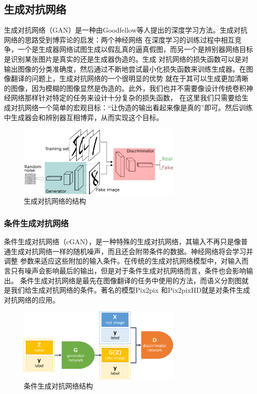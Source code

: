 \documentclass[supercite]{HustGraduPaper}
\theoremstyle{definition}
\begin{document}
\subsection{生成对抗网络}

生成对抗网络（GAN）是一种由Goodfellow等人提出的深度学习方法\cite{Goodfellow-et-al-2016}。生成对抗网络的思路受到博弈论的启发：两个神经网络
在深度学习的训练过程中相互竞争，一个是生成器网络试图生成以假乱真的逼真假图，而另一个是辨别器网络目标是识别某张图片是真实的还是生成器伪造的。生成
对抗网络的损失函数可以是对输出图像的分类准确度，然后通过不断地尝试最小化损失函数来训练生成器。在图像翻译的问题上，生成对抗网络的一个很明显的优势
就在于其可以生成更加清晰的图像，因为模糊的图像显然是伪造的。此外，我们也并不需要像设计传统卷积神经网络那样针对特定的任务来设计十分复杂的损失函数，
在这里我们只需要给生成对抗网络一个简单的宏观目标：“让伪造的输出看起来像是真的”即可。然后训练中生成器会和辨别器互相博弈，从而实现这个目标。
\begin{figure}[H]
  \begin{center}
  \includegraphics[width=8cm]{images/GANs}
  \end{center}
  \caption{生成对抗网络的结构}
  \label{fig:GANs-structure}
\end{figure}

\subsubsection{条件生成对抗网络}

条件生成对抗网络（cGAN），是一种特殊的生成对抗网络，其输入不再只是像普通生成对抗网络一样的随机噪声，而且还会附带条件的数据。神经网络将会学习并调整
参数来适应这些附加的输入条件。在传统的生成对抗网络模型中，对输入而言只有噪声会影响最后的输出，但是对于条件生成对抗网络而言，条件也会影响输出。
条件生成对抗网络是最先在图像翻译的任务中使用的方法，而语义分割图就是我们给生成对抗网络的条件。著名的模型Pix2pix\cite{pix2pix2016}
和Pix2pixHD\cite{wang2018pix2pixHD}就是对条件生成对抗网络的应用。
\begin{figure}[H]
  \begin{center}
  \includegraphics[width=8cm]{images/cGANs}
  \end{center}
  \caption{条件生成对抗网络结构}
  \label{fig:cGANs-structure}
\end{figure}
\end{document}
